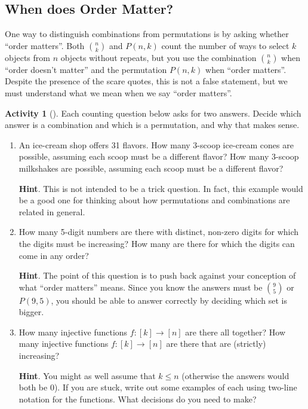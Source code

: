 \documentclass[10pt,]{book}
\theoremstyle{plain}
\theoremstyle{definition}
\theoremstyle{definition}
\theoremstyle{definition}
\newtheorem{activity}[project]{Activity}
\theoremstyle{definition}
\numberwithin{equation}{chapter}
\begin{document}
\subsection[{When does Order Matter?}]{When does Order Matter?}\label{subsec-ordermatters}
\hypertarget{p-694}{}%
One way to distinguish combinations from permutations is by asking whether ``order matters''.  Both \(\binom{n}{k}\) and \(P(n,k)\) count the number of ways to select \(k\) objects from \(n\) objects without repeats, but you use the combination \(\binom{n}{k}\) when ``order doesn't matter'' and the permutation \(P(n,k)\) when ``order matters''.  Despite the presence of the scare quotes, this is not a false statement, but we must understand what we mean when we say ``order matters''.%
\begin{activity}[]\label{activity-59}
\hypertarget{p-695}{}%
Each counting question below asks for two answers.  Decide which answer is a combination and which is a permutation, and why that makes sense.%
\begin{enumerate}[font=\bfseries,label=(\alph*),ref=\alph*]
\item\label{task-78} \hypertarget{p-696}{}%
An ice-cream shop offers 31 flavors.  How many 3-scoop ice-cream cones are possible, assuming each scoop must be a different flavor?  How many 3-scoop milkshakes are possible, assuming each scoop must be a different flavor?%
\par\smallskip%
\noindent\textbf{Hint}.\hypertarget{hint-50}{}\quad%
\hypertarget{p-697}{}%
This is not intended to be a trick question.  In fact, this example would be a good one for thinking about how permutations and combinations are related in general.%
\item\label{task-79} \hypertarget{p-698}{}%
How many 5-digit numbers are there with distinct, non-zero digits for which the digits must be increasing?  How many are there for which the digits can come in any order?%
\par\smallskip%
\noindent\textbf{Hint}.\hypertarget{hint-51}{}\quad%
\hypertarget{p-699}{}%
The point of this question is to push back against your conception of what ``order matters'' means.  Since you know the answers must be \(\binom{9}{5}\) or \(P(9,5)\), you should be able to answer correctly by deciding which set is bigger.%
\item\label{task-80} \hypertarget{p-700}{}%
How many injective functions \(f:[k] \to [n]\) are there all   together?  How many injective functions \(f:[k] \to [n]\) are there that are (strictly) increasing?%
\par\smallskip%
\noindent\textbf{Hint}.\hypertarget{hint-52}{}\quad%
\hypertarget{p-701}{}%
You might as well assume that \(k \le n\) (otherwise the answers would both be 0).  If you are stuck, write out some examples of each using two-line notation for the functions.  What decisions do you need to make?%
\end{enumerate}
\end{activity}
\end{document}
